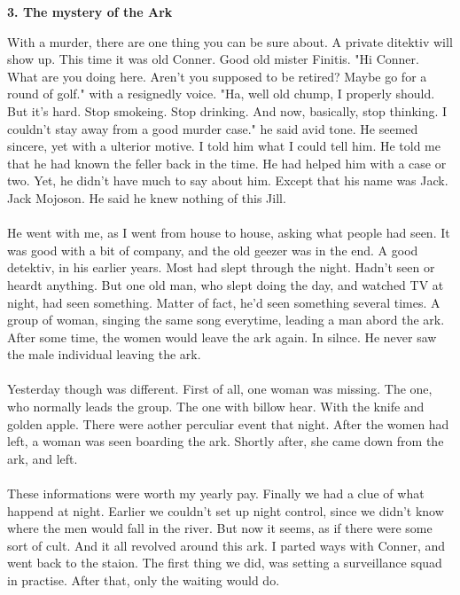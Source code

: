 \documentclass[]{article}
\begin{document}
\begin{center}
	\large\textbf{3. The mystery of the Ark}
\end{center}

With a murder, there are one thing you can be sure about. A private ditektiv will show up. This time it was old Conner. Good old mister Finitis. "Hi Conner. What are you doing here. Aren't you supposed to be retired? Maybe go for a round of golf." with a resignedly voice. "Ha, well old chump, I properly should. But it's hard. Stop smokeing. Stop drinking. And now, basically, stop thinking. I couldn't stay away from a good murder case." he said avid tone. He seemed sincere, yet with a ulterior motive. I told him what I could tell him. He told me that he had known the feller back in the time. He had helped him with a case or two. Yet, he didn't have much to say about him. Except that his name was Jack. Jack Mojoson. He said he knew nothing of this Jill.
\\ \\
He went with me, as I went from house to house, asking what people had seen. It was good with a bit of company, and the old geezer was in the end. A good detektiv, in his earlier years. Most had slept through the night. Hadn't seen or heardt anything. But one old man, who slept doing the day, and watched TV at night, had seen something. Matter of fact, he'd seen something several times. A group of woman, singing the same song everytime, leading a man abord the ark. After some time, the women would leave the ark again. In silnce. He never saw the male individual leaving the ark.
\\ \\
Yesterday though was different. First of all, one woman was missing. The one, who normally leads the group. The one with billow hear. With the knife and golden apple. There were aother perculiar event that night. After the women had left, a woman was seen boarding the ark. Shortly after, she came down from the ark, and left. 
\\ \\
These informations were worth my yearly pay. Finally we had a clue of what happend at night. Earlier we couldn't set up night control, since we didn't know where the men would fall in the river. But now it seems, as if there were some sort of cult. And it all revolved around this ark. I parted ways with Conner, and went back to the staion. The first thing we did, was setting a surveillance squad in practise. After that, only the waiting would do.
\\ \\
\end{document}
